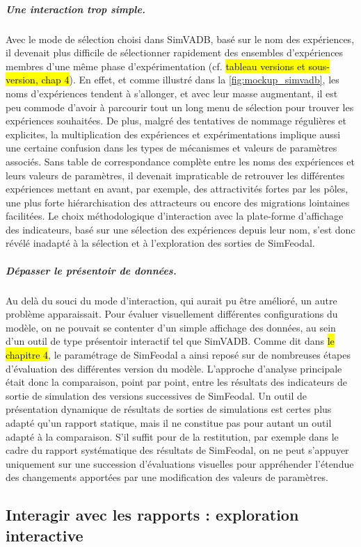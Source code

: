 \subparagraph{Une interaction trop simple.}
Avec le mode de sélection choisi dans SimVADB, basé sur le nom des expériences, il devenait plus difficile de sélectionner rapidement des ensembles d'expériences membres d'une même phase d'expérimentation (cf. \hl{tableau versions et sous-version, chap 4}).
En effet, et comme illustré dans la \cref{fig:mockup_simvadb}, les noms d'expériences tendent à s'allonger, et avec leur masse augmentant, il est peu commode d'avoir à parcourir tout un long menu de sélection pour trouver les expériences souhaitées.
De plus, malgré des tentatives de nommage régulières et explicites, la multiplication des expériences et expérimentations implique aussi une certaine confusion dans les types de mécanismes et valeurs de paramètres associés.
Sans table de correspondance complète entre les noms des expériences et leurs valeurs de paramètres, il devenait impraticable de retrouver les différentes expériences mettant en avant, par exemple, des attractivités fortes par les pôles, une plus forte hiérarchisation des attracteurs ou encore des migrations lointaines facilitées.
Le choix méthodologique d'interaction avec la plate-forme d'affichage des indicateurs, basé sur une sélection des expériences depuis leur nom, s'est donc révélé inadapté à la sélection et à l'exploration des sorties de SimFeodal.

\subparagraph{Dépasser le \og présentoir\fg{} de données.}
Au delà du souci du mode d'interaction, qui aurait pu être amélioré, un autre problème apparaissait.
Pour évaluer visuellement différentes configurations du modèle, on ne pouvait se contenter d'un simple affichage des données, au sein d'un outil de type présentoir interactif tel que SimVADB.
Comme dit dans \hl{le chapitre 4}, le paramétrage de SimFeodal a ainsi reposé sur de nombreuses étapes d'évaluation des différentes version du modèle.
L'approche d'analyse principale était donc la comparaison, point par point, entre les résultats des indicateurs de sortie de simulation des versions successives de SimFeodal.
Un outil de présentation dynamique de résultats de sorties de simulations est certes plus adapté qu'un rapport statique, mais il ne constitue pas pour autant un outil adapté à la comparaison.
S'il suffit pour de la restitution, par exemple dans le cadre du rapport systématique des résultats de SimFeodal, on ne peut s'appuyer uniquement sur une succession d'évaluations visuelles pour appréhender l'étendue des changements apportées par une modification des valeurs de paramètres.

\subsection{Interagir avec les rapports : exploration interactive}\label{subsec:explo-interactive}

